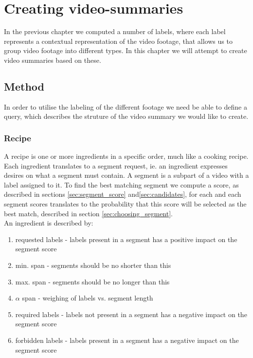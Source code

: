 %
\chapter{Creating video-summaries}
%
In the previous chapter we computed a number of labels, where each label represents a contextual representation of the video footage, that allows us to group video footage into different types. In this chapter we will attempt to create video summaries based on these. 
%
\section{Method}
%
In order to utilise the labeling of the different footage we need be able to define a query, which describes the struture of the video summary we would like to create.
%
\subsection{Recipe}\label{sec:recipe}
%
A recipe is one or more ingredients in a specific order, much like a cooking recipe. Each ingredient translates to a segment request, ie. an ingredient expresses desires on what a segment must contain. A segment is a subpart of a video with a label assigned to it. To find the best matching segment we compute a score, as described in sections \ref{sec:segment_score} and\ref{sec:candidates}, for each and each segment scores translates to the probability that this score will be selected as the best match, described in section \ref{sec:choosing_segment}.\\
An ingredient is described by:
%
\begin{enumerate}
\item requested labels - labels present in a segment has a positive impact on the segment score
\item min. span - segments should be no shorter than this
\item max. span - segments should be no longer than this
\item $\alpha$ span - weighing of labels vs. segment length
\item required labels - labels not present in a segment has a negative impact on the segment score
\item forbidden labels - labels present in a segment has a negative impact on the segment score
\end{enumerate}
%
